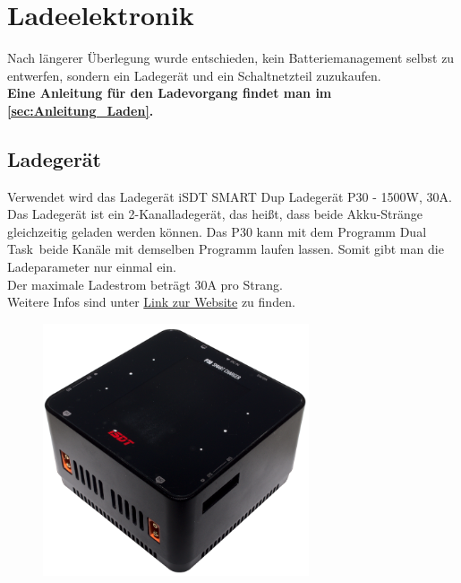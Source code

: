 \section{Ladeelektronik}
Nach längerer Überlegung wurde entschieden, kein Batteriemanagement selbst zu entwerfen, sondern ein Ladegerät und ein Schaltnetzteil zuzukaufen. \\

\textbf{Eine Anleitung für den Ladevorgang findet man im \autoref{sec:Anleitung_Laden}.}


\subsection{Ladegerät}
Verwendet wird das Ladegerät \glqq iSDT SMART Dup Ladegerät P30 - 1500W, 30A\grqq. Das Ladegerät ist ein 2-Kanalladegerät, das heißt, 
dass beide Akku-Stränge gleichzeitig geladen werden können. 
Das P30 kann mit dem Programm \glqq Dual Task\grqq\ beide Kanäle mit demselben Programm laufen lassen. Somit gibt man die Ladeparameter nur einmal ein. \\
Der maximale Ladestrom beträgt 30$\mathrm{A}$ pro Strang. \\
Weitere Infos sind unter \href{https://www.modell-hubschrauber.at/Ladegeraete-Netzteile-Ladekabel-und-Zubehoer/Ladegeraete/Ladegeraete-12Volt/iSDT-SMART-Dup-Ladegeraet-P30-1500W-30A-8S-Lipo::43075.html}{Link zur Website} 
zu finden. 

\begin{figure}[H]
    \centering
    \includegraphics[width=0.7\textwidth]{Fotos/SP30_DSC_8784.png}
\end{figure}

